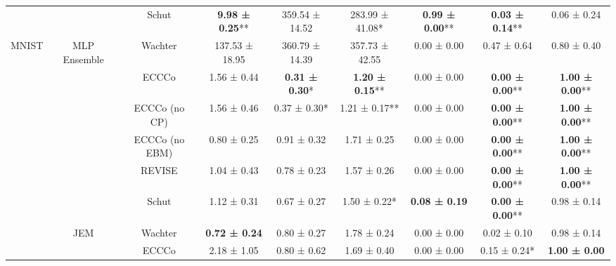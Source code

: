 \begin{table}
{\begin{tabular}[t]{ccccccccc}
 &  & Schut & \textbf{9.98 ± 0.25}** & 359.54 ± 14.52\hphantom{*}\hphantom{*} & 283.99 ± 41.08*\hphantom{*} & \textbf{0.99 ± 0.00}** & \textbf{0.03 ± 0.14}** & 0.06 ± 0.24\hphantom{*}\hphantom{*}\\

\multirow[t]{-16}{*}{\centering\arraybackslash MNIST} & \multirow[t]{-4}{*}{\centering\arraybackslash MLP Ensemble} & Wachter & 137.53 ± 18.95\hphantom{*}\hphantom{*} & 360.79 ± 14.39\hphantom{*}\hphantom{*} & 357.73 ± 42.55\hphantom{*}\hphantom{*} & 0.00 ± 0.00\hphantom{*}\hphantom{*} & 0.47 ± 0.64\hphantom{*}\hphantom{*} & 0.80 ± 0.40\hphantom{*}\hphantom{*}\\
\cmidrule{1-9}
 &  & ECCCo & 1.56 ± 0.44\hphantom{*}\hphantom{*} & \textbf{0.31 ± 0.30}*\hphantom{*} & \textbf{1.20 ± 0.15}** & 0.00 ± 0.00\hphantom{*}\hphantom{*} & \textbf{0.00 ± 0.00}** & \textbf{1.00 ± 0.00}**\\

 &  & ECCCo (no CP) & 1.56 ± 0.46\hphantom{*}\hphantom{*} & 0.37 ± 0.30*\hphantom{*} & 1.21 ± 0.17** & 0.00 ± 0.00\hphantom{*}\hphantom{*} & \textbf{0.00 ± 0.00}** & \textbf{1.00 ± 0.00}**\\

 &  & ECCCo (no EBM) & 0.80 ± 0.25\hphantom{*}\hphantom{*} & 0.91 ± 0.32\hphantom{*}\hphantom{*} & 1.71 ± 0.25\hphantom{*}\hphantom{*} & 0.00 ± 0.00\hphantom{*}\hphantom{*} & \textbf{0.00 ± 0.00}** & \textbf{1.00 ± 0.00}**\\

 &  & REVISE & 1.04 ± 0.43\hphantom{*}\hphantom{*} & 0.78 ± 0.23\hphantom{*}\hphantom{*} & 1.57 ± 0.26\hphantom{*}\hphantom{*} & 0.00 ± 0.00\hphantom{*}\hphantom{*} & \textbf{0.00 ± 0.00}** & \textbf{1.00 ± 0.00}**\\

 &  & Schut & 1.12 ± 0.31\hphantom{*}\hphantom{*} & 0.67 ± 0.27\hphantom{*}\hphantom{*} & 1.50 ± 0.22*\hphantom{*} & \textbf{0.08 ± 0.19}\hphantom{*}\hphantom{*} & \textbf{0.00 ± 0.00}** & 0.98 ± 0.14\hphantom{*}\hphantom{*}\\

 & \multirow[t]{-6}{*}{\centering\arraybackslash JEM} & Wachter & \textbf{0.72 ± 0.24}\hphantom{*}\hphantom{*} & 0.80 ± 0.27\hphantom{*}\hphantom{*} & 1.78 ± 0.24\hphantom{*}\hphantom{*} & 0.00 ± 0.00\hphantom{*}\hphantom{*} & 0.02 ± 0.10\hphantom{*}\hphantom{*} & 0.98 ± 0.14\hphantom{*}\hphantom{*}\\
\cmidrule{2-9}
 &  & ECCCo & 2.18 ± 1.05\hphantom{*}\hphantom{*} & 0.80 ± 0.62\hphantom{*}\hphantom{*} & 1.69 ± 0.40\hphantom{*}\hphantom{*} & 0.00 ± 0.00\hphantom{*}\hphantom{*} & 0.15 ± 0.24*\hphantom{*} & \textbf{1.00 ± 0.00}\hphantom{*}\hphantom{*}\\


\end{tabular}}
\end{table}

